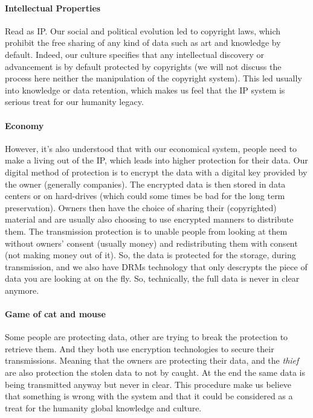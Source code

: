 \paragraph{Intellectual Properties} Read as IP. Our social and political evolution led to copyright laws, which prohibit the free sharing of any kind of data such as art and knowledge by default. Indeed, our culture specifies that any intellectual discovery or advancement is by default protected by copyrights (we will not discuss the process here neither the manipulation of the copyright system). This led usually into knowledge or data retention, which makes us feel that the IP system is serious treat for our humanity legacy.

\paragraph{Economy} However, it's also understood that with our economical system, people need to make a living out of the IP, which leads into higher protection for their data. Our digital method of protection is to encrypt the data with a digital key provided by the owner (generally companies). The encrypted data is then stored in data centers or on hard-drives (which could some times be bad for the long term preservation). Owners then have the choice of sharing their (copyrighted) material and are usually also choosing to use encrypted manners to distribute them. The transmission protection is to unable people from looking at them without owners' consent (usually money) and redistributing them with consent (not making money out of it). So,  the data is protected for the storage, during transmission, and we also have DRMs technology that only descrypts the piece of data you are looking at on the fly. So, technically, the full data is never in clear anymore.

\paragraph{Game of cat and mouse} Some people are protecting data, other are trying to break the protection to retrieve them. And they both use encryption technologies to secure their transmissions. Meaning that the owners are protecting their data, and the \textit{thief} are also protection the stolen data to not by caught. At the end the same data is being transmitted anyway but never in clear. This procedure make us believe that something is wrong with the system and that it could be considered as a treat for the humanity global knowledge and culture.


